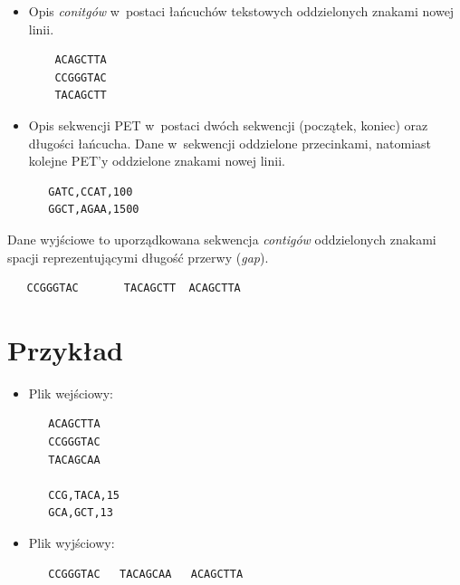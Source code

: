 \documentclass[a4paper,10pt]{article}
\begin{document}
\begin{itemize}
 \item Opis \emph{conitgów} w~postaci łańcuchów tekstowych oddzielonych znakami nowej linii.
 
  \begin{verbatim}
    ACAGCTTA
    CCGGGTAC
    TACAGCTT
  \end{verbatim}
  \item Opis sekwencji PET w~postaci dwóch sekwencji (początek, koniec) oraz długości łańcucha. Dane w~sekwencji oddzielone przecinkami, natomiast kolejne PET'y oddzielone znakami nowej linii.
  
  \begin{verbatim}
   GATC,CCAT,100
   GGCT,AGAA,1500
  \end{verbatim}
\end{itemize}

Dane wyjściowe to uporządkowana sekwencja \emph{contigów} oddzielonych znakami spacji reprezentującymi długość przerwy (\emph{gap}).

  \begin{verbatim}
   CCGGGTAC       TACAGCTT  ACAGCTTA
  \end{verbatim}

\section*{Przykład}

\begin{itemize}
 \item Plik wejściowy:
  \begin{verbatim}
   ACAGCTTA
   CCGGGTAC
   TACAGCAA

   CCG,TACA,15
   GCA,GCT,13
  \end{verbatim}
 \item Plik wyjściowy:
  \begin{verbatim}
   CCGGGTAC   TACAGCAA   ACAGCTTA
  \end{verbatim}
\end{itemize}
\end{document}
